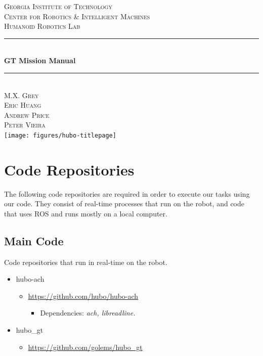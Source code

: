 \documentclass[letterpaper, 10 pt]{report}
\begin{document}
\begin{titlepage}
\center
\textsc{\LARGE Georgia Institute of Technology}\\[1.5cm]
\textsc{\large Center for Robotics \& Intelligent Machines}\\[0.5cm]
\textsc{\large Humanoid Robotics Lab}\\[0.5cm]
\rule{\linewidth}{0.5mm}\\[0.4cm]
{\huge \bfseries GT Mission Manual}\\[0.4cm]
\rule{\linewidth}{0.5mm}\\[1.5cm]
\textsc{\normalsize M.X. Grey}\\
\textsc{\normalsize Eric Huang}\\
\textsc{\normalsize Andrew Price}\\
\textsc{\normalsize Peter Vieira}\\[1.5cm]
\texttt{[image: figures/hubo-titlepage]}
\vfill
\end{titlepage}


\tableofcontents
\newpage


%
\chapter{Code Repositories}\label{chap:code-repos}
The following code repositories are required in order to execute our tasks using our code. They consist of real-time processes that run on the robot, and code that uses ROS and runs mostly on a local computer.
\section{Main Code}
Code repositories that run in real-time on the robot.
\begin{itemize}
\item hubo-ach
  \begin{itemize}
	\item \url{https://github.com/hubo/hubo-ach}
	  \begin{itemize}
	    \item Dependencies: \textit{ach, libreadline.}
	  \end{itemize}
  \end{itemize}
\item hubo\_gt
  \begin{itemize}
	\item \url{https://github.com/golems/hubo_gt}
  \end{itemize}
\end{itemize}
\end{document}
